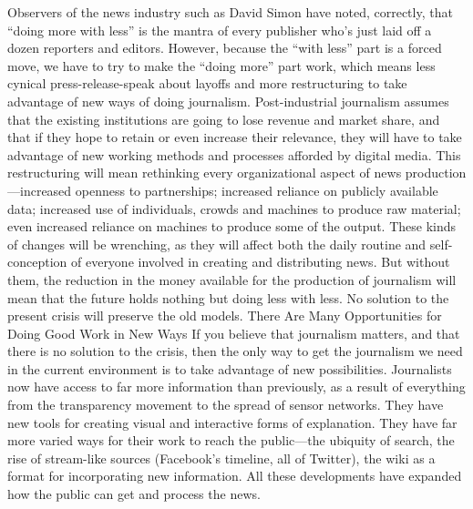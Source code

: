 Observers of the news industry such as David Simon have noted, correctly, that
``doing more with less'' is the mantra of every publisher who’s just laid off a
dozen reporters and editors. However, because the ``with less'' part is a forced
move, we have to try to make the ``doing more'' part work, which means less
cynical press-release-speak about layoffs and more restructuring to take advantage
of new ways of doing journalism.
Post-industrial journalism assumes that the existing institutions are going to lose
revenue and market share, and that if they hope to retain or even increase their
relevance, they will have to take advantage of new working methods and processes
afforded by digital media.
This restructuring will mean rethinking every organizational aspect of news
production—increased openness to partnerships; increased reliance on publicly
available data; increased use of individuals, crowds and machines to produce raw
material; even increased reliance on machines to produce some of the output.
These kinds of changes will be wrenching, as they will affect both the daily routine
and self-conception of everyone involved in creating and distributing news.
But without them, the reduction in the money available for the production of
journalism will mean that the future holds nothing but doing less with less. No
solution to the present crisis will preserve the old models.
There Are Many Opportunities for Doing Good Work in New Ways
If you believe that journalism matters, and that there is no solution to the crisis,
then the only way to get the journalism we need in the current environment is
to take advantage of new possibilities.
Journalists now have access to far more information than previously, as a result
of everything from the transparency movement to the spread of sensor networks.
They have new tools for creating visual and interactive forms of explanation.
They have far more varied ways for their work to reach the public—the ubiquity
of search, the rise of stream-like sources (Facebook’s timeline, all of Twitter), the
wiki as a format for incorporating new information. All these developments have
expanded how the public can get and process the news.

